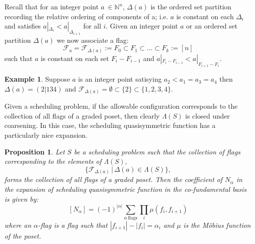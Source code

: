 \documentclass[12pt,reqno]{amsart}
\numberwithin{definition}{section}
\newtheorem{proposition}[definition]{Proposition}
\theoremstyle{definition}
\newtheorem{example}[definition]{Example}
\newcommand{\ncM}{\mathcal{M}}
\newcommand{\ncN}{\mathcal{N}}
\newcommand{\allow}{\Lambda} %
\begin{document}


  Recall that for an integer point $a\ \in \mathbb{N}^n$,
  $\Delta(a)$ is the ordered set partition recording the relative
  ordering of components of a; i.e. $a$ is constant on each $\Delta_i$
  and satisfies $a|_{\Delta_i} < a|_{\Delta_{i+1}}$ for all $i$.
Given an integer point $a$ or an ordered set partition $\Delta(a)$ we now associate a flag:
$$\mathscr{F}_{a} = \mathscr{F}_{\Delta(a)} := F_0 \subset F_1 \subset \ldots \subset F_k := [n]$$
such that $a$ is constant on each set $F_i - F_{i-1}$ and  $a|_{F_i -
  F_{i-1}} < a|_{F_{i+1} - F_{i}} $. 

\begin{example}
Suppose $a$ is an integer point satisying $a_2 < a_1 = a_3 = a_4$ then $\Delta(a) = (2|134)$ and $\mathscr{F}_{\Delta(a)} = {\emptyset \subset \{2\} \subset \{1,2,3,4\}}$.
\end{example}



Given a scheduling problem, if the allowable configuration corresponds
to the collection of all flags of a graded poset, then clearly $\allow(S)$ is closed under coarsening.  In this case, the scheduling 
quasisymmetric function has a particularly nice expansion.

\begin{proposition}
\label{prop:flags}
Let $S$ be a scheduling problem such that the collection of flags corresponding to the elements of $\allow(S)$,
$$\{ \mathscr{F}_{\Delta(a)} \, | \, \Delta(a) \in \allow(S) \},$$
forms the collection of all flags of a graded poset.  Then the coefficient of $N_{\alpha}$ in the expansion of scheduling quasisymmetric function in the co-fundamental basis is given by:
$$[N_{\alpha}] = (-1)^{|\alpha|} \sum_{\alpha \, \textrm{flags}} \prod_i \mu(f_i,f_{i+1})$$
where an $\alpha$-flag is a flag such that $|f_{i+1}| - |f_i| = \alpha_i$ and $\mu$ is the M\"{o}bius function of the poset.
\end{proposition}
\end{document}
